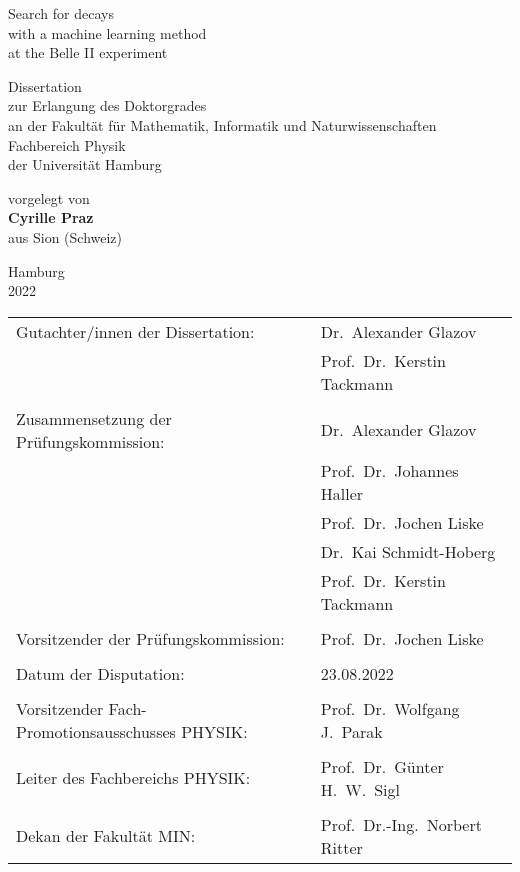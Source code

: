 \thispagestyle{empty}
\begin{center}
\huge{Search for \BKnn decays \\ with a machine learning method \\ at the Belle II experiment}

\vspace{0.2\textheight}
\large{Dissertation \\ zur Erlangung des Doktorgrades \\ an der Fakult\"at f\"ur Mathematik, Informatik und Naturwissenschaften \\ Fachbereich Physik \\ der Universit\"at Hamburg}

\vspace{0.2\textheight}
\large{vorgelegt von \\ \textbf{Cyrille Praz} \\ aus Sion (Schweiz)}

\vspace{0.1\textheight}
\large{Hamburg \\ 2022}
\end{center}

\newpage
\thispagestyle{empty}

\newpage
\thispagestyle{empty}

\vspace*{\fill}

\begin{tabular*}{\textwidth}{l @{\extracolsep{\fill}} l}
Gutachter/innen der Dissertation: & Dr.~Alexander Glazov \\
& Prof.~Dr.~Kerstin Tackmann \\
\\
Zusammensetzung der Prüfungskommission: & Dr.~Alexander Glazov \\
& Prof.~Dr.~Johannes Haller\\
& Prof.~Dr.~Jochen Liske \\
& Dr.~Kai Schmidt-Hoberg  \\
& Prof.~Dr.~Kerstin Tackmann \\
\\
Vorsitzender der Prüfungskommission: & Prof.~Dr.~Jochen Liske \\
\\
Datum der Disputation: & 23.08.2022 \\ %
\\
Vorsitzender Fach-Promotionsausschusses PHYSIK: &  Prof.~Dr.~Wolfgang J.~Parak \\
\\
Leiter des Fachbereichs PHYSIK: & Prof.~Dr.~Günter H.~W.~Sigl \\
\\
Dekan der Fakultät MIN: & Prof.~Dr.-Ing.~Norbert Ritter \\
\end{tabular*}

\newpage
\thispagestyle{empty}

